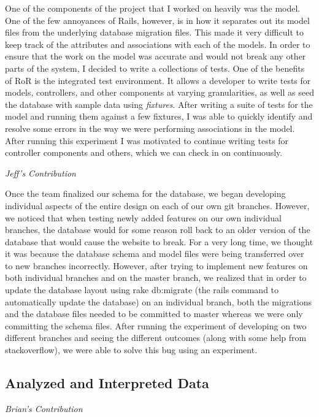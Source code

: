 \documentclass[11pt]{article}
\begin{document}
One of the components of the project that I worked on heavily was the model. One of the few annoyances of Rails, however, is in how it separates out its model files from the underlying database migration files. This made it very difficult to keep track of the attributes and associations with each of the models. In order to ensure that the work on the model was accurate and would not break any other parts of the system, I decided to write a collections of tests. One of the benefits of RoR is the integrated test environment. It allows a developer to write tests for models, controllers, and other components at varying granularities, as well as seed the database with sample data using \textit{fixtures}. After writing a suite of tests for the model and running them against a few fixtures, I was able to quickly identify and resolve some errors in the way we were performing associations in the model. After running this experiment I was motivated to continue writing tests for controller components and others, which we can check in on continuously. 

\textit{Jeff's Contribution}

Once the team finalized our schema for the database, we began developing individual aspects of the entire design on each of our own git branches.  However, we noticed that when testing newly added features on our own individual branches, the database would for some reason roll back to an older version of the database that would cause the website to break.  For a very long time, we thought it was because the database schema and model files were being transferred over to new branches incorrectly.  However, after trying to implement new features on both individual branches and on the master branch, we realized that in order to update the database layout using rake db:migrate (the rails command to automatically update the database) on an individual branch, both the migrations and the database files needed to be committed to master whereas we were only committing the schema files.  After running the experiment of developing on two different branches and seeing the different outcomes (along with some help from stackoverflow), we were able to solve this bug using an experiment.

\subsection{Analyzed and Interpreted Data}

\textit{Brian's Contribution}
\end{document}
